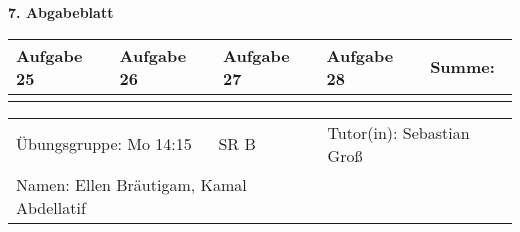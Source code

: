 \documentclass[a4paper, 12pt]{scrartcl}
\begin{document}
\begin{center}
    \textbf{7. Abgabeblatt}\\[2em]
	\def\arraystretch{2}
    \begin{tabular}{|l|l|l|l||p{18mm}|}
        \hline
        Aufgabe 25 & Aufgabe 26 & Aufgabe 27 & Aufgabe 28 & Summe:~ \\
        \hline &&&&\\
         \hline  
    \end{tabular}
\end{center}
\begingroup
\def\arraystretch{1.5}
\begin{tabular}{p{}p{}}
	\hline
    Übungsgruppe: Mo 14:15 ~~ SR B& Tutor(in): Sebastian Groß\\
    Namen: Ellen Bräutigam, Kamal Abdellatif &\\
    \hline
\end{tabular}
\endgroup\\
\end{document}
